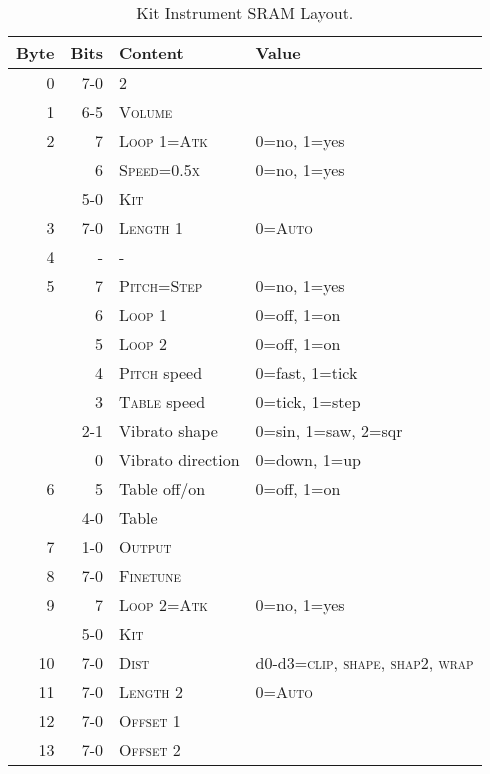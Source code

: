 \begin{table}
	\begin{center}
		\caption{Kit Instrument SRAM Layout.}
		\begin{tabular}{r|r|l|l}
			\toprule
   Byte & Bits	& Content 		& Value \\
   \midrule
      0	& 7-0 	& 2 			& \\
      1	& 6-5 	& \textsc{Volume} 	& \\
      2	& 7   	& \textsc{Loop 1=Atk} 	& 0=no, 1=yes \\
	& 6   	& \textsc{Speed=0.5x} 	& 0=no, 1=yes \\
	& 5-0 	& \textsc{Kit} 		& \\
      3	& 7-0 	& \textsc{Length 1} 	& 0=\textsc{Auto} \\
      4	& -   	& - 			& \\
      5	& 7   	& \textsc{Pitch=Step} 	& 0=no, 1=yes \\
	& 6   	& \textsc{Loop 1} 	& 0=off, 1=on \\
	& 5   	& \textsc{Loop 2} 	& 0=off, 1=on \\
	& 4   	& \textsc{Pitch} speed	& 0=fast, 1=tick \\
	& 3   	& \textsc{Table} speed	& 0=tick, 1=step \\
	& 2-1 	& Vibrato shape		& 0=sin, 1=saw, 2=sqr \\
	& 0   	& Vibrato direction	& 0=down, 1=up \\
      6	& 5   	& Table off/on		& 0=off, 1=on \\
	& 4-0 	& Table			& \\
      7	& 1-0 	& \textsc{Output}	& \\
      8	& 7-0 	& \textsc{Finetune}	& \\
      9	& 7   	& \textsc{Loop 2=Atk} 	& 0=no, 1=yes \\
	& 5-0 	& \textsc{Kit} 		& \\
     10	& 7-0 	& \textsc{Dist} 	& d0-d3=\textsc{clip, shape, shap2, wrap} \\
     11	& 7-0 	& \textsc{Length 2} 	& 0=\textsc{Auto} \\
     12	& 7-0 	& \textsc{Offset 1} 	& \\
     13	& 7-0 	& \textsc{Offset 2} 	& \\
   \bottomrule
		\end{tabular}
	\end{center}
\end{table}

